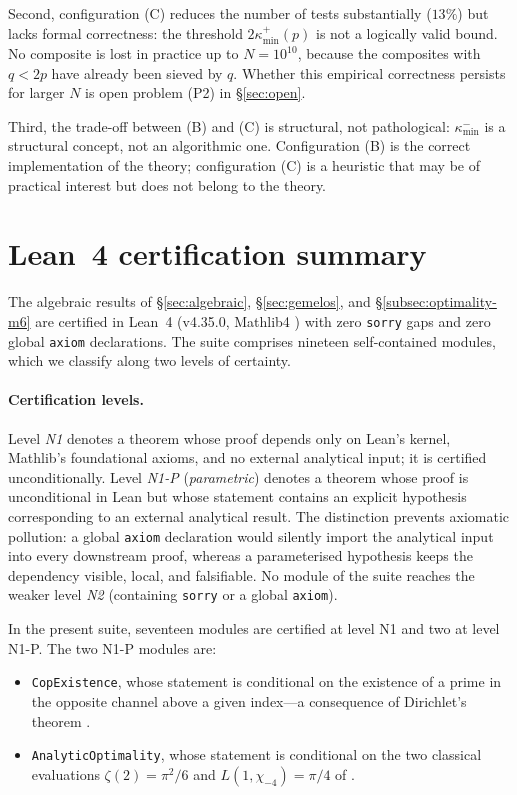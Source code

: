 \documentclass[11pt]{amsart}
\numberwithin{equation}{section}
\newcommand{\kminp}{\kappa_{\min}^{+}}
\newcommand{\kminm}{\kappa_{\min}^{-}}
\theoremstyle{plain}
\theoremstyle{definition}
\begin{document}
Second, configuration (C) reduces the number of tests substantially
($13\%$) but lacks formal correctness: the threshold $2\kminp(p)$ is
not a logically valid bound. No composite is lost in practice up to
$N=10^{10}$, because the composites with $q<2p$ have already been
sieved by $q$. Whether this empirical correctness persists for larger
$N$ is open problem (P2) in \S\ref{sec:open}.

Third, the trade-off between (B) and (C) is structural, not
pathological: $\kminm$ is a structural concept, not an algorithmic
one. Configuration (B) is the correct implementation of the theory;
configuration (C) is a heuristic that may be of practical interest
but does not belong to the theory.

\section{Lean~4 certification summary}
\label{app:lean4}

The algebraic results of \S\ref{sec:algebraic}, \S\ref{sec:gemelos},
and \S\ref{subsec:optimality-m6} are certified in Lean~4 \cite{Lean4}
(v4.35.0, Mathlib4 \cite{Mathlib2020}) with zero \texttt{sorry} gaps
and zero global \texttt{axiom} declarations. The suite comprises
nineteen self-contained modules, which we classify along two levels
of certainty.

\paragraph{Certification levels.}
Level \emph{N1} denotes a theorem whose proof depends only on Lean's
kernel, Mathlib's foundational axioms, and no external analytical
input; it is certified unconditionally. Level \emph{N1-P}
(\emph{parametric}) denotes a theorem whose proof is unconditional in
Lean but whose statement contains an explicit hypothesis
corresponding to an external analytical result. The distinction
prevents axiomatic pollution: a global \texttt{axiom} declaration
would silently import the analytical input into every downstream
proof, whereas a parameterised hypothesis keeps the dependency
visible, local, and falsifiable. No module of the suite reaches the
weaker level \emph{N2} (containing \texttt{sorry} or a global
\texttt{axiom}).

In the present suite, seventeen modules are certified at level N1 and
two at level N1-P. The two N1-P modules are:
\begin{itemize}
\item \texttt{CopExistence}, whose statement is conditional on the
  existence of a prime in the opposite channel above a given
  index---a consequence of Dirichlet's theorem \cite{Dirichlet1837}.
\item \texttt{AnalyticOptimality}, whose statement is conditional on
  the two classical evaluations $\zeta(2)=\pi^2/6$ and
  $L(1,\chi_{-4})=\pi/4$ of \cite{Apostol1976,Davenport2000}.
\end{itemize}
\end{document}
